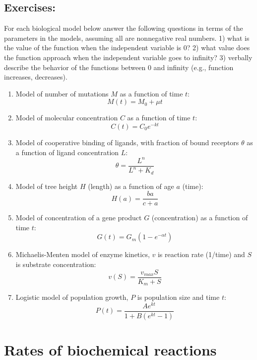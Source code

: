 \documentclass[
  letterpaper,
  DIV=11,
  numbers=noendperiod]{scrreprt}
\begin{document}
\hypertarget{exercises-4}{%
\subsection{Exercises:}\label{exercises-4}}

For each biological model below answer the following questions in terms
of the parameters in the models, assuming all are nonnegative real
numbers. 1) what is the value of the function when the independent
variable is 0? 2) what value does the function approach when the
independent variable goes to infinity? 3) verbally describe the behavior
of the functions between 0 and infinity (e.g., function increases,
decreases).

\begin{enumerate}
\def\labelenumi{\arabic{enumi}.}
\item
  Model of number of mutations \(M\) as a function of time \(t\):
  \[ M(t) = M_0 + \mu t\]
\item
  Model of molecular concentration \(C\) as a function of time \(t\):
  \[ C(t) = C_0 e^{-kt} \]
\item
  Model of cooperative binding of
  ligands, with fraction of bound
  receptors \(\theta\) as a function of ligand concentration \(L\):
  \[ \theta = \frac{L^n}{L^n + K_d}\]
\item
  Model of tree height \(H\) (length) as a function of age \(a\) (time):
  \[ H(a) = \frac{b a }{c + a}\]
\item
  Model of concentration of a gene product \(G\) (concentration) as a
  function of time \(t\): \[ G(t) = G_m (1 - e^{-\alpha t})\]
\item
  Michaelis-Menten model  of enzyme
  kinetics, \(v\) is reaction rate (1/time) and \(S\) is substrate
  concentration: \[ v(S) = \frac{v_{max} S}{K_m + S}\]
\item
  Logistic model of population growth, \(P\) is
  population size and time \(t\):
  \[ P(t) = \frac{A e^{kt}}{1 + B(e^{kt} -1)} \]
\end{enumerate}

\hypertarget{rates-of-biochemical-reactions}{%
\section{Rates of biochemical
reactions}\label{rates-of-biochemical-reactions}}

\label{sec:bio2}
\end{document}
